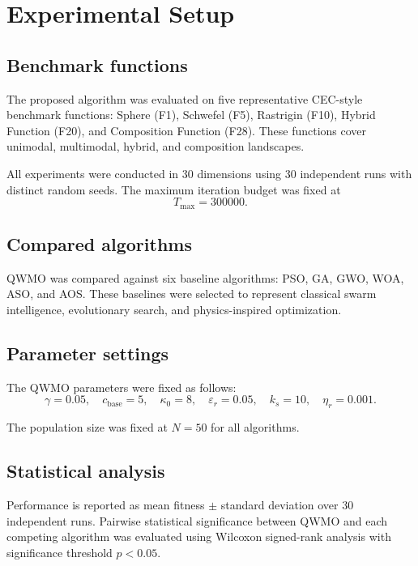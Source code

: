 \documentclass[final,5p,times,twocolumn]{elsarticle}
\begin{document}

\section{Experimental Setup}
\label{sec:experiments}

\subsection{Benchmark functions}

The proposed algorithm was evaluated on five representative
CEC-style benchmark functions:
Sphere (F1), Schwefel (F5), Rastrigin (F10), Hybrid Function
(F20), and Composition Function (F28). These functions cover
unimodal, multimodal, hybrid, and composition landscapes.

All experiments were conducted in 30 dimensions using
30 independent runs with distinct random seeds. The maximum
iteration budget was fixed at
\[
T_{\max}=300000.
\]

\subsection{Compared algorithms}

QWMO was compared against six baseline algorithms:
PSO, GA, GWO, WOA, ASO, and AOS. These baselines were selected
to represent classical swarm intelligence, evolutionary search,
and physics-inspired optimization.

\subsection{Parameter settings}

The QWMO parameters were fixed as follows:
\[
\gamma=0.05,\quad
c_{\mathrm{base}}=5,\quad
\kappa_0=8,\quad
\varepsilon_r=0.05,\quad
k_s=10,\quad
\eta_r=0.001.
\]

The population size was fixed at $N=50$ for all algorithms.

\subsection{Statistical analysis}

Performance is reported as mean fitness $\pm$ standard deviation
over 30 independent runs. Pairwise statistical significance
between QWMO and each competing algorithm was evaluated using
Wilcoxon signed-rank analysis with significance threshold
$p<0.05$.
\end{document}
